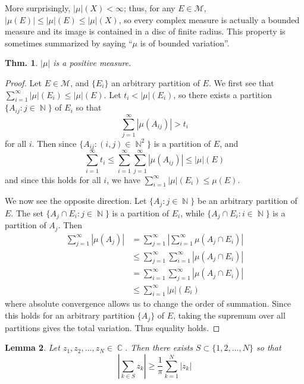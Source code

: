 \documentclass[12pt, a4paper]{book}
\DeclareMathOperator{\N}{\mathbb{N}}
\DeclareMathOperator{\C}{\mathbb{C}}
\newtheorem{theorem}{Thm.}[section]
\newtheorem{lemma}[theorem]{Lemma}
\theoremstyle{nonumberplain}
\newtheorem{proof}{Proof}
\begin{document}
More surprisingly, $|\mu|(X)<\infty$; thus, for any $E\in\mathcal{M}$, $|\mu(E)|\leq|\mu|(E)\leq|\mu|(X)$, so every complex measure is actually a bounded measure and its image is contained in a disc of finite radius.
This property is sometimes summarized by saying ``$\mu$ is of bounded variation''.
\begin{theorem}
    $|\mu|$ is a positive measure.
\end{theorem}
\begin{proof}
    Let $E\in\mathcal{M}$, and $\{E_i\}$ an arbitrary partition of $E$.
    We first see that $\sum_{i=1}^\infty|\mu|(E_i)\leq|\mu|(E)$.
    Let $t_i<|\mu|(E_i)$, so there exists a partition $\{A_{ij}:j\in\N\}$ of $E_i$ so that
    \[\sum\limits_{j=1}^\infty|\mu(A_{ij})|>t_i\]
    for all $i$.
    Then since $\{A_{ij}:(i,j)\in\N^2\}$ is a partition of $E$, and
    \[\sum\limits_{i=1}^\infty t_i\leq\sum\limits_{i=1}^\infty\sum\limits_{j=1}^\infty|\mu(A_{ij})|\leq|\mu|(E)\]
    and since this holds for all $i$, we have $\sum_{i=1}^\infty|\mu|(E_i)\leq\mu(E)$.

    We now see the opposite direction.
    Let $\{A_j:j\in\N\}$ be an arbitrary partition of $E$.
    The set $\{A_j\cap E_i:j\in\N\}$ is a partition of $E_i$, while $\{A_j\cap E_i:i\in\N\}$ is a partition of $A_j$.
    Then
    \begin{align*}
        \sum\limits_{j=1}^\infty|\mu(A_j)| &= \sum\limits_{j=1}^\infty\left\lvert\sum\limits_{i=1}^\infty \mu(A_j\cap E_i)\right\rvert\\
                                           &\leq\sum\limits_{j=1}^\infty\sum\limits_{i=1}^\infty|\mu(A_j\cap E_i)|\\
                                           &=\sum\limits_{i=1}^\infty\sum\limits_{j=1}^\infty|\mu(A_j\cap E_i)|\\
                                           &\leq \sum\limits_{i=1}^\infty|\mu|(E_i)
    \end{align*}
    where absolute convergence allows us to change the order of summation.
    Since this holds for an arbitrary partition $\{A_j\}$ of $E$, taking the supremum over all partitions gives the total variation.
    Thus equality holds.
\end{proof}
\begin{lemma}
    Let $z_1,z_2,\ldots,z_N\in\C$.
    Then there exists $S\subset\{1,2,\ldots,N\}$ so that
    \[\left\lvert\sum\limits_{k\in S}z_k\right\rvert\geq\frac{1}{\pi}\sum\limits_{k=1}^N|z_k|\]
\end{lemma}
\end{document}
